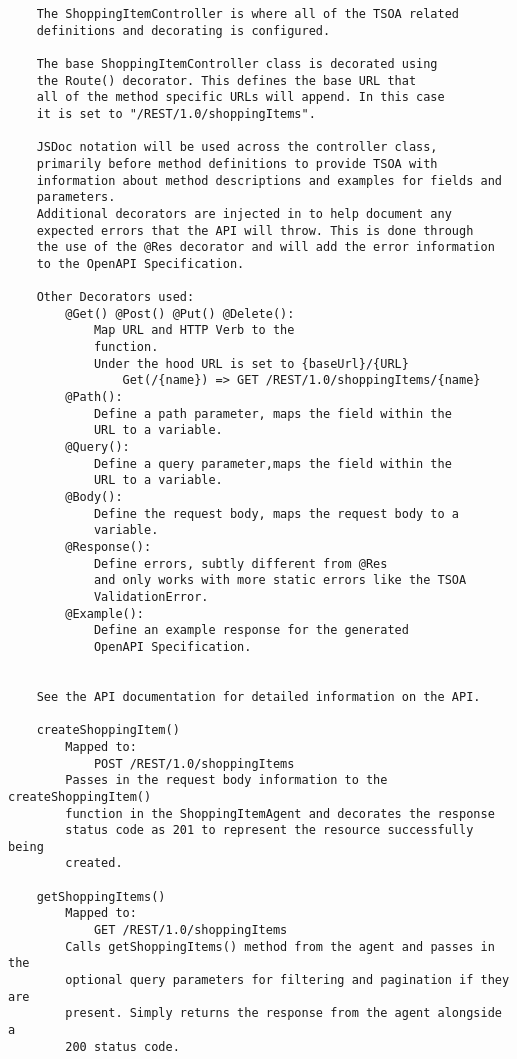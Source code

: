 \begin{verbatim}
    The ShoppingItemController is where all of the TSOA related
    definitions and decorating is configured.
    
    The base ShoppingItemController class is decorated using
    the Route() decorator. This defines the base URL that
    all of the method specific URLs will append. In this case
    it is set to "/REST/1.0/shoppingItems".
    
    JSDoc notation will be used across the controller class,
    primarily before method definitions to provide TSOA with
    information about method descriptions and examples for fields and
    parameters.
    Additional decorators are injected in to help document any
    expected errors that the API will throw. This is done through
    the use of the @Res decorator and will add the error information
    to the OpenAPI Specification.
    
    Other Decorators used:
        @Get() @Post() @Put() @Delete(): 
            Map URL and HTTP Verb to the
            function. 
            Under the hood URL is set to {baseUrl}/{URL}
                Get(/{name}) => GET /REST/1.0/shoppingItems/{name}
        @Path(): 
            Define a path parameter, maps the field within the
            URL to a variable.
        @Query(): 
            Define a query parameter,maps the field within the
            URL to a variable.
        @Body(): 
            Define the request body, maps the request body to a 
            variable.
        @Response(): 
            Define errors, subtly different from @Res
            and only works with more static errors like the TSOA
            ValidationError.
        @Example(): 
            Define an example response for the generated
            OpenAPI Specification.
        
    
    See the API documentation for detailed information on the API.
    
    createShoppingItem()
        Mapped to:
            POST /REST/1.0/shoppingItems
        Passes in the request body information to the createShoppingItem()
        function in the ShoppingItemAgent and decorates the response
        status code as 201 to represent the resource successfully being
        created.
    
    getShoppingItems()
        Mapped to:
            GET /REST/1.0/shoppingItems
        Calls getShoppingItems() method from the agent and passes in the
        optional query parameters for filtering and pagination if they are
        present. Simply returns the response from the agent alongside a
        200 status code.
    

\end{verbatim}
